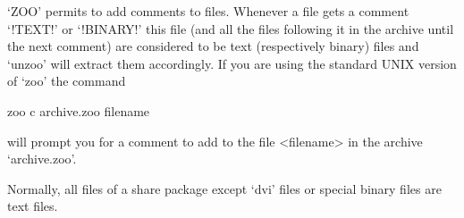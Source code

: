 `ZOO' permits to add comments to files. Whenever a file gets a comment
`!TEXT!' or `!BINARY!' this file (and all the files following it in the
archive until the next comment) are considered to be text (respectively
binary) files and `unzoo' will extract them accordingly. If you are using
the standard UNIX version of `zoo' the command

\begintt
zoo c archive.zoo filename
\endtt

will prompt you for a comment to add to the file <filename> in the archive
`archive.zoo'.

Normally, all files of a share package except `dvi' files or special binary
files are text files.



